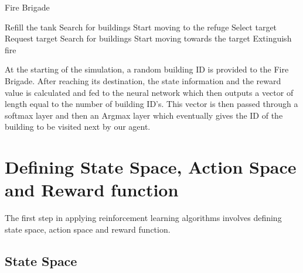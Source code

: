 \documentclass[12pt]{report}
\begin{document}
\begin{algorithm}
\caption{Fire Brigade}
\begin{algorithmic}

\STATE  Refill the tank
\ENDIF 
{}
\STATE Search for buildings
\ENDIF
{}
\STATE Start moving to the refuge
\ENDIF
{}
\STATE Select target
\STATE Request target
\ELSE 
\STATE  Search for buildings 
\ENDIF 
\ENDIF
{}
\STATE Start moving towards the target
\ENDIF
{}
\STATE Extinguish fire
\ENDIF
\end{algorithmic}
\end{algorithm}


At the starting of the simulation, a random building ID is provided to the Fire Brigade. After reaching its destination, the state information and the reward value is calculated and fed to the neural network which then outputs a vector of length equal to the number of building ID's. This vector is then passed through a softmax layer and then an Argmax layer which eventually gives the ID of the building to be visited next by our agent. 


\section{Defining State Space, Action Space and Reward function}

The first step in applying reinforcement learning algorithms involves defining state space, action space and reward function. 

\subsection{State Space}
    
\end{document}
